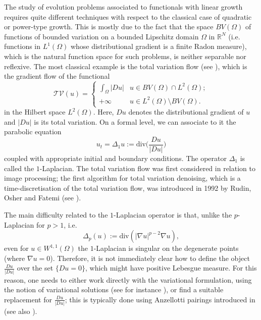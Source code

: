 \documentclass[reqno,12pt]{amsart}
\def\R{\mathbb R}
\numberwithin{equation}{section}
\newcommand{\twopartdef}[4]
{
	\left\{
	\begin{array}{ll}
		#1 & #2 \\
		#3 & #4
	\end{array}
	\right.
}
\begin{document}
The study of evolution problems associated to functionals with linear growth requires quite different techniques with respect to the classical case of quadratic or power-type growth. This is mostly due to the fact that the space $BV(\Omega)$ of functions of bounded variation on a bounded Lipschitz domain $\Omega$ in $\R^N$ (i.e. functions in $L^1(\Omega)$ whose distributional gradient is a finite Radon measure), which is the natural function space for such problems, is neither separable nor reflexive. The most classical example is the total variation flow (see \cite{ACMBook}), which is the gradient flow of the functional 
\begin{equation*}
\mathcal{TV}(u) = \twopartdef{\int_\Omega |Du|}{u \in BV(\Omega) \cap L^2(\Omega);}{+\infty}{u \in L^2(\Omega) \setminus BV(\Omega).}
\end{equation*}
in the Hilbert space $L^2(\Omega)$. Here, $Du$ denotes the distributional gradient of $u$ and $|Du|$ is its total variation. On a formal level, we can associate to it the parabolic equation
\begin{equation}\label{eq:tvflow}
u_t = \Delta_1 u := \mathrm{div}\bigg( \frac{Du}{|Du|} \bigg)
\end{equation}
coupled with appropriate initial and boundary conditions. The operator $\Delta_1$ is called the $1$-Laplacian. The total variation flow was first considered in relation to image processing; the first algorithm for total variation denoising, which is a time-discretisation of the total variation flow, was introduced in 1992 by Rudin, Osher and Fatemi (see \cite{ROF}).

The main difficulty related to the $1$-Laplacian operator is that, unlike the $p$-Laplacian for $p > 1$, i.e.
\begin{equation}
\Delta_p(u) := \mathrm{div}(|\nabla u|^{p-2} \nabla u),
\end{equation}
even for $u \in W^{1,1}(\Omega)$ the $1$-Laplacian is singular on the degenerate points (where $\nabla u = 0$). Therefore, it is not immediately clear how to define the object $\frac{Du}{|Du|}$ over the set $\{ D u = 0 \}$, which might have positive Lebesgue measure. For this reason, one needs to either work directly with the variational formulation, using the notion of variational solutions (see for instance \cite{BDM1}), or find a suitable replacement for $\frac{Du}{|Du|}$; this is typically done using Anzellotti pairings introduced in \cite{Anzellotti} (see also \cite{KT0,KT}).
\end{document}
